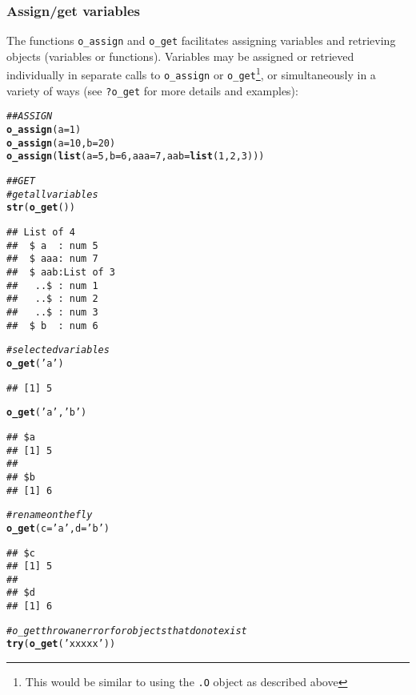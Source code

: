 \documentclass[english,10pt,a4paper]{article}\usepackage[]{graphicx}\usepackage[]{color}
\makeatletter
\newcommand{\hlnum}[1]{\textcolor[rgb]{0.686,0.059,0.569}{#1}}%
\newcommand{\hlstr}[1]{\textcolor[rgb]{0.192,0.494,0.8}{#1}}%
\newcommand{\hlcom}[1]{\textcolor[rgb]{0.678,0.584,0.686}{\textit{#1}}}%
\newcommand{\hlstd}[1]{\textcolor[rgb]{0.345,0.345,0.345}{#1}}%
\newcommand{\hlkwc}[1]{\textcolor[rgb]{0.333,0.667,0.333}{#1}}%
\newcommand{\hlkwd}[1]{\textcolor[rgb]{0.737,0.353,0.396}{\textbf{#1}}}%
\newenvironment{kframe}{%
 \def\at@end@of@kframe{}%
 \ifinner\ifhmode%
  \def\at@end@of@kframe{\end{minipage}}%
  \begin{minipage}{\columnwidth}%
 \fi\fi%
 \def\FrameCommand##1{\hskip\@totalleftmargin \hskip-\fboxsep
 \colorbox{shadecolor}{##1}\hskip-\fboxsep
     \hskip-\linewidth \hskip-\@totalleftmargin \hskip\columnwidth}%
 \MakeFramed {\advance\hsize-\width
   \@totalleftmargin\z@ \linewidth\hsize
   \@setminipage}}%
 {\par\unskip\endMakeFramed%
 \at@end@of@kframe}
\newenvironment{knitrout}{}{} %
\let\code=\texttt
\makeatother
\begin{document}
\subsubsection{Assign/get variables}

The functions \code{o\_assign} and \code{o\_get} facilitates assigning variables
and retrieving objects (variables or functions).
Variables may be assigned or retrieved individually in separate calls to
\code{o\_assign} or \code{o\_get}\footnote{This would be similar to using the
\code{.O} object as described above}, or simultaneously in a variety of ways
(see \code{?o\_get} for more details and examples):

\begin{knitrout}
\color{fgcolor}\begin{kframe}
\begin{alltt}
\hlcom{## ASSIGN}
\hlkwd{o_assign}\hlstd{(}\hlkwc{a}\hlstd{=}\hlnum{1}\hlstd{)}
\hlkwd{o_assign}\hlstd{(}\hlkwc{a}\hlstd{=}\hlnum{10}\hlstd{,} \hlkwc{b}\hlstd{=}\hlnum{20}\hlstd{)}
\hlkwd{o_assign}\hlstd{(}\hlkwd{list}\hlstd{(}\hlkwc{a}\hlstd{=}\hlnum{5}\hlstd{,} \hlkwc{b}\hlstd{=}\hlnum{6}\hlstd{,} \hlkwc{aaa}\hlstd{=}\hlnum{7}\hlstd{,} \hlkwc{aab}\hlstd{=}\hlkwd{list}\hlstd{(}\hlnum{1}\hlstd{,}\hlnum{2}\hlstd{,}\hlnum{3}\hlstd{)))}

\hlcom{## GET}
\hlcom{# get all variables}
\hlkwd{str}\hlstd{(} \hlkwd{o_get}\hlstd{() )}
\end{alltt}
\begin{verbatim}
## List of 4
##  $ a  : num 5
##  $ aaa: num 7
##  $ aab:List of 3
##   ..$ : num 1
##   ..$ : num 2
##   ..$ : num 3
##  $ b  : num 6
\end{verbatim}
\begin{alltt}
\hlcom{# selected variables}
\hlkwd{o_get}\hlstd{(}\hlstr{'a'}\hlstd{)}
\end{alltt}
\begin{verbatim}
## [1] 5
\end{verbatim}
\begin{alltt}
\hlkwd{o_get}\hlstd{(}\hlstr{'a'}\hlstd{,} \hlstr{'b'}\hlstd{)}
\end{alltt}
\begin{verbatim}
## $a
## [1] 5
## 
## $b
## [1] 6
\end{verbatim}
\begin{alltt}
\hlcom{# rename on the fly}
\hlkwd{o_get}\hlstd{(}\hlkwc{c}\hlstd{=}\hlstr{'a'}\hlstd{,} \hlkwc{d}\hlstd{=}\hlstr{'b'}\hlstd{)}
\end{alltt}
\begin{verbatim}
## $c
## [1] 5
## 
## $d
## [1] 6
\end{verbatim}
\begin{alltt}
\hlcom{# o_get throw an error for objects that do not exist}
\hlkwd{try}\hlstd{(} \hlkwd{o_get}\hlstd{(}\hlstr{'xxxxx'}\hlstd{) )}
\end{alltt}



\end{kframe}
\end{knitrout}
\end{document}
